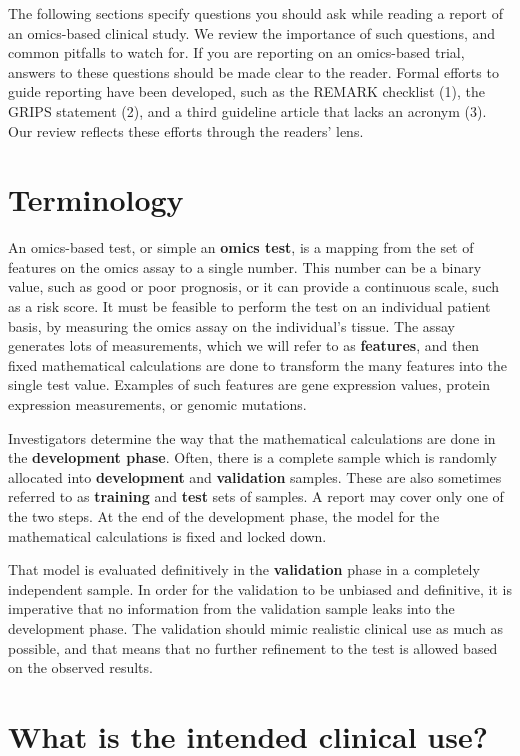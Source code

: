 \documentclass[11pt]{article}
\begin{document}
The following sections specify questions you should ask while reading a
report of an omics-based clinical study. We review the importance of
such questions, and common pitfalls to watch for. If you are reporting
on an omics-based trial, answers to these questions should be made clear
to the reader. Formal efforts to guide reporting have been developed,
such as the REMARK checklist (1), the GRIPS statement (2), and a third
guideline article that lacks an acronym (3). Our review reflects these
efforts through the readers' lens.

\section{Terminology}\label{terminology}

An omics-based test, or simple an \textbf{omics test}, is a mapping from
the set of features on the omics assay to a single number. This number
can be a binary value, such as good or poor prognosis, or it can provide
a continuous scale, such as a risk score. It must be feasible to perform
the test on an individual patient basis, by measuring the omics assay on
the individual's tissue. The assay generates lots of measurements, which
we will refer to as \textbf{features}, and then fixed mathematical
calculations are done to transform the many features into the single
test value. Examples of such features are gene expression values,
protein expression measurements, or genomic mutations.

Investigators determine the way that the mathematical calculations are
done in the \textbf{development phase}. Often, there is a complete
sample which is randomly allocated into \textbf{development} and
\textbf{validation} samples. These are also sometimes referred to as
\textbf{training} and \textbf{test} sets of samples. A report may cover
only one of the two steps. At the end of the development phase, the
model for the mathematical calculations is fixed and locked down.

That model is evaluated definitively in the \textbf{validation} phase in
a completely independent sample. In order for the validation to be
unbiased and definitive, it is imperative that no information from the
validation sample leaks into the development phase. The validation
should mimic realistic clinical use as much as possible, and that means
that no further refinement to the test is allowed based on the observed
results.

\section{What is the intended clinical
use?}\label{what-is-the-intended-clinical-use}
\end{document}
